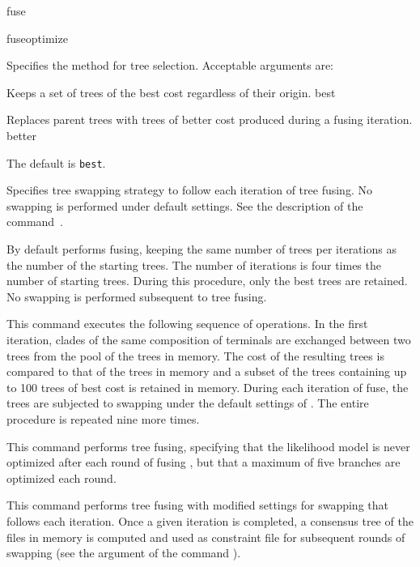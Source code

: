 \begin{command}{fuse}{}
\begin{arguments}
{\begin{description}
\end{description}
}
{fuseoptimize}

{Specifies the method for tree selection. Acceptable arguments
are:

\begin{description}
 {}
{Keeps a set of trees of the best cost regardless of their origin.}
{best}

 {}
{Replaces parent trees with trees of better cost
produced during a fusing iteration.}
{better}

\end{description}

The default is \texttt{best}.}
{}

{Specifies tree swapping strategy to follow each iteration of tree fusing.
No swapping is performed under default settings.
See the description of the command~.}
{}

\end{arguments}

{By default \poy performs fusing, keeping the same number of trees per
iterations as the number of the starting trees. The number of iterations is
four times the number of starting trees. During this procedure, only the best
trees are retained. No swapping is performed subsequent to tree fusing.}

\begin{poyexamples}

{This command executes the following sequence of operations. In the
first iteration, clades of the same composition of terminals are exchanged
between two trees from the pool of the trees in memory. The cost of the
resulting trees is compared to that of the trees in memory and a subset of
the trees containing up to 100 trees of best cost is retained in memory.
During each iteration of fuse, the trees are subjected to swapping under 
the default settings of . The entire procedure is 
repeated nine more times.}

{This command performs tree fusing, specifying that the likelihood model is 
never optimized after each round of fusing , but that a maximum of five 
branches are optimized each round.}

{This command performs tree fusing 
with modified settings for swapping that follows each iteration. Once
a given iteration is completed, a consensus tree of the files in memory
is computed and used as constraint file for subsequent rounds of swapping (see
the argument  of the command
).}  


\end{poyexamples}
\end{command}
